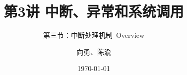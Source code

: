


\title[第3讲]{第3讲 中断、异常和系统调用} %
\subtitle{第三节：中断处理机制--Overview}
\author{向勇、陈渝} %
\date{\today} %



\begin{frame}
\titlepage %
\end{frame}



